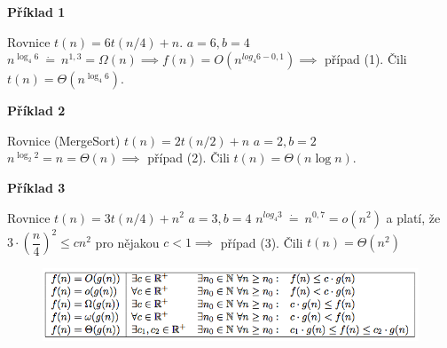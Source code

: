 \documentclass{szzclass}
\begin{document}
\textbf{Příklad 1}

Rovnice $t(n) = 6t(n/4) + n$.\newline
$a = 6, b = 4$\newline
$n^{\log_4 6}~\dot{=}~n^{1,3} = \Omega(n) \implies f(n) = O(n^{log_4 6-0,1}) \implies$ případ (1).\newline
Čili $t(n) = \Theta(n^{\log_4 6})$.

\textbf{Příklad 2}

Rovnice (MergeSort) $t(n) = 2t(n/2) + n$\newline
$a = 2, b = 2$\newline
$n^{\log_2 2} = n = \Theta(n) \implies$ případ (2).\newline
Čili $t(n) = \Theta(n \log n)$.

\textbf{Příklad 3}

Rovnice $t(n) = 3t(n/4) + n^2$\newline
$a = 3, b = 4$\newline
$n^{log_4 3}~\dot{=}~n^{0,7} = o(n^2)$ a platí, že $3 \cdot (\dfrac{n}{4})^2 \leq cn^2$ pro
nějakou $c < 1 \implies$ případ (3).\newline
Čili $t(n) = Θ(n^2)$



\begin{figure}[h]
    \includegraphics[width=\textwidth, center]{topics/bi-spol-32/images/slozitost.png}
\end{figure}

\end{document}
